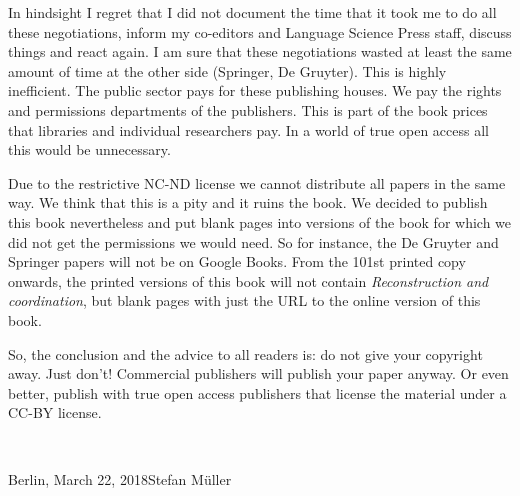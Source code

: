 \begin{refsection}
\begin{table}
\caption{\label{tab-interaction-with-publishers}Interaction with publishers and results}
\end{table}

In hindsight I regret that I did not document the time that it took me to do all these negotiations, inform
my co-editors and Language Science Press staff, discuss things and react again. I am sure that these
negotiations wasted at least the same amount of time at the other side (Springer, De Gruyter). This is highly
inefficient. The public sector pays for these publishing houses. We pay the rights and
permissions departments of the publishers. This is part of the book prices that libraries and
individual researchers pay. In a world of true open access all this would be unnecessary.

Due to the restrictive NC-ND license we cannot distribute all papers in the same way. We think that
this is a pity and it ruins the book. We decided to publish this book nevertheless and put blank pages
into versions of the book for which we did not get the permissions we would need. So for instance,
the De Gruyter and Springer papers will not be on Google Books. From the 101st printed copy onwards,
the printed versions of this book will not contain \emph{Reconstruction and coordination}, but blank pages with just the URL to the online
version of this book.

So, the conclusion and the advice to all readers is: do not give your copyright away. Just don't!
Commercial publishers will publish your paper anyway. Or even better, publish with true open access publishers that
license the material under a CC-BY license.

~\medskip

\noindent
Berlin, March 22, 2018\hfill Stefan Müller








\printbibliography[heading=subbibliography,notkeyword=this]
\end{refsection}


